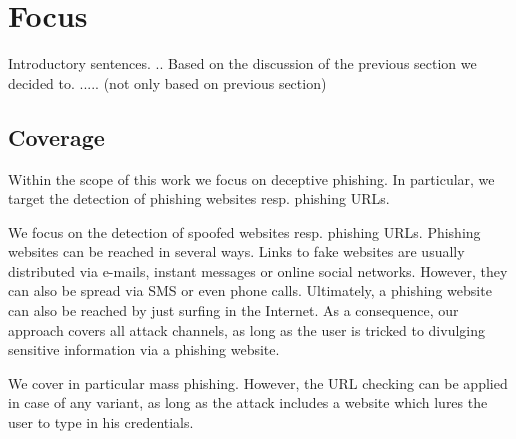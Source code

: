 \section{Focus}
\label{s:assumptions}
Introductory sentences.
..
Based on the discussion of the previous section we decided to.
..... (not only based on previous section)

\subsection{Coverage}
\begin{description}[leftmargin=0cm]
	\item[Deceptive Phishing as Phishing Technique] Within the scope of this work we focus on deceptive phishing.
 In particular, we target the detection of phishing websites resp. phishing URLs.
 
	\item[Several Attack Channels] We focus on the detection of spoofed websites resp. phishing URLs.
 Phishing websites can be reached in several ways.
 Links to fake websites are usually distributed via e-mails, instant messages or online social networks.
 However, they can also be spread via SMS or even phone calls.
 Ultimately, a phishing website can also be reached by just surfing in the Internet.
 As a consequence, our approach covers all attack channels, as long as the user is tricked to divulging sensitive information via a phishing website.

	\item[Mass Phishing as Variation of Phishing] We cover in particular mass phishing.
 However, the URL checking can be applied in case of any variant, as long as the attack includes a website which lures the user to type in his credentials.


\end{description}
